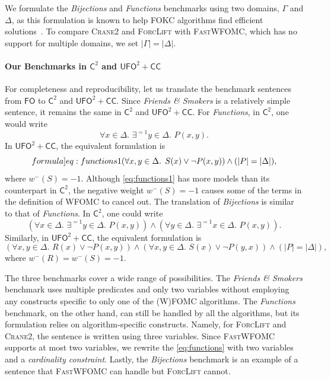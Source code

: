 \documentclass[a4paper,UKenglish,cleveref,autoref,table]{lipics-v2021}
\newcommand{\Cranetwo}{\textsc{Crane2}}
\newcommand{\friends}{\emph{Friends \& Smokers}}
\newcommand{\functions}{\emph{Functions}}
\newcommand{\bijections}{\emph{Bijections}}
\newcommand{\Ctwo}{$\mathsf{C}^{2}$}
\newcommand{\FO}{$\mathsf{FO}$}
\newcommand{\UFO}{$\mathsf{UFO}^{2} + \mathsf{CC}$}
\begin{document}
\begin{remark*}
  We formulate the \bijections{} and \functions{} benchmarks using two domains,
  $\Gamma$ and $\Delta$, as this formulation is known to help FOKC algorithms
  find efficient solutions~\cite{DBLP:conf/kr/DilkasB23}. To compare \Cranetwo{}
  and \textsc{ForcLift} with \textsc{FastWFOMC}, which has no support for
  multiple domains, we set $|\Gamma| = |\Delta|$.
\end{remark*}

\paragraph*{Our Benchmarks in \Ctwo{} and \UFO{}}
For completeness and reproducibility, let us translate the benchmark sentences
from \FO{} to \Ctwo{} and \UFO{}. Since \friends{} is a relatively simple
sentence, it remains the same in \Ctwo{} and \UFO{}. For \functions{}, in
\Ctwo{}, one would write
\[
  \forall x \in \Delta\text{. }\exists^{=1} y \in \Delta\text{. }P(x, y).
\]
In \UFO{}, the equivalent formulation is
\begin{equation}\label[formula]{eq:functions1}
  (\forall x, y \in \Delta\text{. }S(x) \lor \neg P(x, y)) \land (|P| = |\Delta|),
\end{equation}
where $w^{-}(S) = -1$. Although \cref{eq:functions1} has more models than its
counterpart in \Ctwo{}, the negative weight $w^{-}(S) = -1$ causes some of the
terms in the definition of WFOMC to cancel out. The translation of \bijections{}
is similar to that of \functions{}. In \Ctwo{}, one could write
\[
  (\forall x \in \Delta\text{. }\exists^{=1} y \in \Delta\text{.
  }P(x, y)) \land (\forall y \in \Delta\text{. }\exists^{=1} x \in \Delta\text{.
  }P(x, y)).
\]
Similarly, in \UFO{}, the equivalent formulation is
\[
  (\forall x, y \in \Delta\text{.
  }R(x) \lor \neg P(x, y)) \land (\forall x, y \in \Delta\text{.
  }S(x) \lor \neg P(y, x)) \land (|P| = |\Delta|),
\]
where $w^{-}(R) = w^{-}(S) = -1$.

The three benchmarks cover a wide range of possibilities. The \friends{}
benchmark uses multiple predicates and only two variables without employing any
constructs specific to only one of the (W)FOMC algorithms. The \functions{}
benchmark, on the other hand, can still be handled by all the algorithms, but
its formulation relies on algorithm-specific constructs. Namely, for
\textsc{ForcLift} and \Cranetwo{}, the sentence is written using three
variables. Since \textsc{FastWFOMC} supports at most two variables, we rewrite
the \cref{eq:functions} with two variables and a \emph{cardinality constraint}.
Lastly, the \bijections{} benchmark is an example of a sentence that
\textsc{FastWFOMC} can handle but \textsc{ForcLift} cannot.
\end{document}
